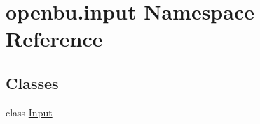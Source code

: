 \hypertarget{namespaceopenbu_1_1input}{}\section{openbu.\+input Namespace Reference}
\label{namespaceopenbu_1_1input}
\subsection*{Classes}
\begin{DoxyCompactItemize}
\item 
class \mbox{\hyperlink{classopenbu_1_1input_1_1_input}{Input}}
\end{DoxyCompactItemize}

